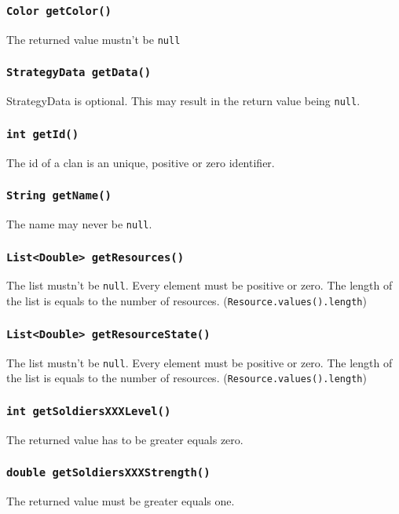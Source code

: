 \documentclass{article}
\begin{document}
\subsubsection{\texttt{Color getColor()}}
The returned value mustn't be \texttt{null}

\subsubsection{\texttt{StrategyData getData()}}
StrategyData is optional. This may result in the return value being \texttt{null}.

\subsubsection{\texttt{int getId()}}
The id of a clan is an unique, positive or zero identifier.

\subsubsection{\texttt{String getName()}}
The name may never be \texttt{null}.

\subsubsection{\texttt{List<Double> getResources()}}
The list mustn't be \texttt{null}. Every element must be positive or zero.
The length of the list is equals to the number of resources. (\texttt{Resource.values().length})

\subsubsection{\texttt{List<Double> getResourceState()}}
The list mustn't be \texttt{null}. Every element must be positive or zero.
The length of the list is equals to the number of resources. (\texttt{Resource.values().length})

\subsubsection{\texttt{int getSoldiersXXXLevel()}}
The returned value has to be greater equals zero.

\subsubsection{\texttt{double getSoldiersXXXStrength()}}
The returned value must be greater equals one.
\end{document}

